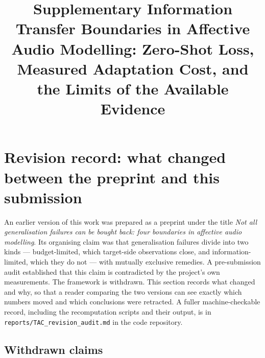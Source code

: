

\renewcommand{\thesection}{S\arabic{section}}
\renewcommand{\thefigure}{S\arabic{figure}}
\renewcommand{\thetable}{S\arabic{table}}

\title{\bfseries Supplementary Information\\[2mm]
\large Transfer Boundaries in Affective Audio Modelling:
Zero-Shot Loss, Measured Adaptation Cost, and the Limits of the
Available Evidence}


\maketitle


\tableofcontents
\clearpage

\section*{Revision record: what changed between the preprint and this
submission}
\label{sec:revision}

An earlier version of this work was prepared as a preprint under the title
\emph{Not all generalisation failures can be bought back: four boundaries in
affective audio modelling}. Its organising claim was that generalisation
failures divide into two kinds --- budget-limited, which target-side
observations close, and information-limited, which they do not --- with
mutually exclusive remedies. A pre-submission audit established that this
claim is contradicted by the project's own measurements. The framework is
withdrawn. This section records what changed and why, so that a reader
comparing the two versions can see exactly which numbers moved and which
conclusions were retracted. A fuller machine-checkable record, including the
recomputation scripts and their output, is in
\texttt{reports/TAC\_revision\_audit.md} in the code repository.

\subsection*{Withdrawn claims}

